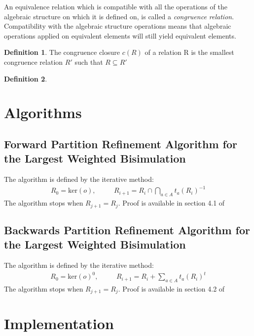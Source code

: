 \documentclass{article}
\theoremstyle{plain}%
\theoremstyle{definition}
\newtheorem{defn}{Definition}[section]
\theoremstyle{remark}
\newcommand{\mker}[1]{\text{ker}\left(#1\right)}
\begin{document}
An equivalence relation which is compatible with all the operations of
the algebraic structure on which it is defined on, is called a 
\textit{congruence relation}. Compatibility with the algebraic structure operations
means that algebraic operations applied on equivalent elements will still
yield equivalent elements. 


\begin{defn}
  The congruence closure $c(R)$ of a relation R is the smallest congruence relation 
  $R'$ such that $R \subseteq R'$ 
\end{defn}

\begin{defn}
  \textbf{} \\
  
\end{defn}

\section{Algorithms}

\subsection{Forward Partition Refinement Algorithm for the Largest Weighted Bisimulation}
\label{sec:algo2}

The algorithm is defined by the iterative method:
\begin{eqnarray}
  R_0 = \mker{o}, & \quad & R_{i+1} = R_i \cap \bigcap_{a \in A} t_a(R_i)^{-1} \label{fwd} 
\end{eqnarray}
The algorithm stops when $R_{j+1} = R_j$. Proof is available in section 4.1 of \cite{BONCHI201277}


\subsection{Backwards Partition Refinement Algorithm for the Largest Weighted Bisimulation}
\label{sec:algo2}

The algorithm is defined by the iterative method:
\begin{eqnarray}
  R_0 = \mker{o}^0, & \quad & R_{i+1} = R_i + \sum_{a \in A} t_a(R_i)^t \label{back} 
\end{eqnarray}
The algorithm stops when $R_{j+1} = R_j$. Proof is available in section 4.2 of \cite{BONCHI201277}

\section{Implementation}
\label{sec:impl}
\end{document}
